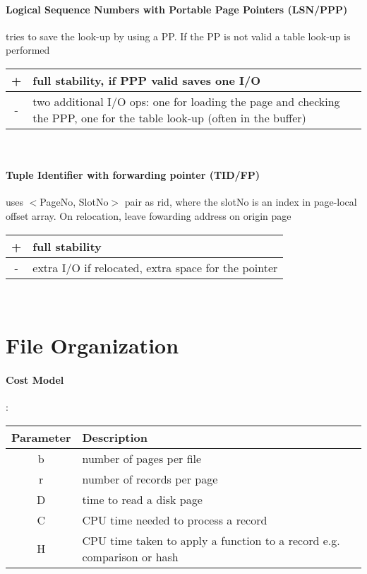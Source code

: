 \paragraph{Logical Sequence Numbers with Portable Page Pointers (LSN/PPP)} tries to save the look-up by using a PP. If the PP is not valid a table look-up is performed\\
\begin{tabular}{c|p{6cm}} \hline
     + & full stability, if PPP valid saves one I/O \\ \hline
     - & two additional I/O ops: one for loading the page and checking the PPP, one for the table look-up (often in the buffer)
\end{tabular} \\

\paragraph{Tuple Identifier with forwarding pointer (TID/FP)} uses $<$PageNo, SlotNo$>$ pair as rid, where the slotNo is an index in page-local offset array. On relocation, leave fowarding address on origin page \\
\begin{tabular}{c|p{6cm}} \hline
     + & full stability \\ \hline
     - & extra I/O if relocated, extra space for the pointer
\end{tabular} \\

\section{File Organization}
\paragraph{Cost Model}: \\
\begin{tabular}{|c|p{6cm}|} \hline
    Parameter & Description \\ \hline
     b & number of pages per file \\ \hline
     r & number of records per page \\ \hline
     D & time to read a disk page \\ \hline
     C & CPU time needed to process a record \\ \hline
     H & CPU time taken to apply a function to a record e.g. comparison or hash \\ \hline
\end{tabular} \\

